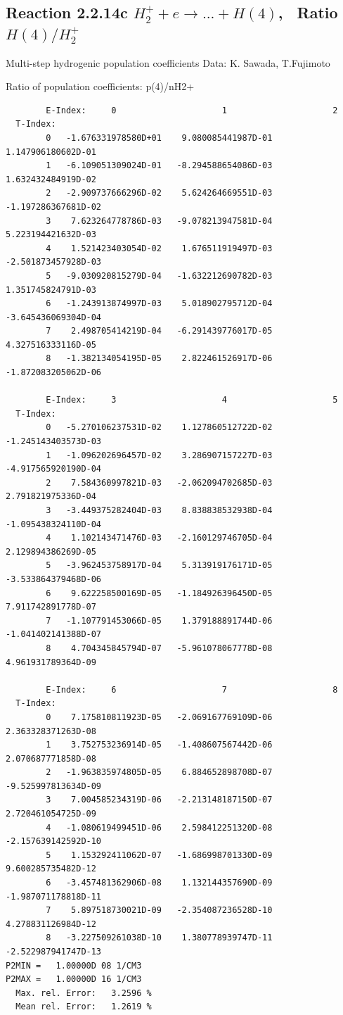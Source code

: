 \documentclass[12pt,dvipdfmx]{article}
\begin{document}
\subsection{
Reaction 2.2.14c $ H_2^+ + e \rightarrow ...+ H(4) $, \   Ratio $H(4)/H_2^+  $
}

 Multi-step hydrogenic population coefficients
 Data: K. Sawada, T.Fujimoto \cite{kn:Sawada}

 Ratio of population coefficients: p(4)/nH2+


\begin{small}\begin{verbatim}
        E-Index:     0                     1                     2
  T-Index:
        0   -1.676331978580D+01    9.080085441987D-01    1.147906180602D-01
        1   -6.109051309024D-01   -8.294588654086D-03    1.632432484919D-02
        2   -2.909737666296D-02    5.624264669551D-03   -1.197286367681D-02
        3    7.623264778786D-03   -9.078213947581D-04    5.223194421632D-03
        4    1.521423403054D-02    1.676511919497D-03   -2.501873457928D-03
        5   -9.030920815279D-04   -1.632212690782D-03    1.351745824791D-03
        6   -1.243913874997D-03    5.018902795712D-04   -3.645436069304D-04
        7    2.498705414219D-04   -6.291439776017D-05    4.327516333116D-05
        8   -1.382134054195D-05    2.822461526917D-06   -1.872083205062D-06

        E-Index:     3                     4                     5
  T-Index:
        0   -5.270106237531D-02    1.127860512722D-02   -1.245143403573D-03
        1   -1.096202696457D-02    3.286907157227D-03   -4.917565920190D-04
        2    7.584360997821D-03   -2.062094702685D-03    2.791821975336D-04
        3   -3.449375282404D-03    8.838838532938D-04   -1.095438324110D-04
        4    1.102143471476D-03   -2.160129746705D-04    2.129894386269D-05
        5   -3.962453758917D-04    5.313919176171D-05   -3.533864379468D-06
        6    9.622258500169D-05   -1.184926396450D-05    7.911742891778D-07
        7   -1.107791453066D-05    1.379188891744D-06   -1.041402141388D-07
        8    4.704345845794D-07   -5.961078067778D-08    4.961931789364D-09

        E-Index:     6                     7                     8
  T-Index:
        0    7.175810811923D-05   -2.069167769109D-06    2.363328371263D-08
        1    3.752753236914D-05   -1.408607567442D-06    2.070687771858D-08
        2   -1.963835974805D-05    6.884652898708D-07   -9.525997813634D-09
        3    7.004585234319D-06   -2.213148187150D-07    2.720461054725D-09
        4   -1.080619499451D-06    2.598412251320D-08   -2.157639142592D-10
        5    1.153292411062D-07   -1.686998701330D-09    9.600285735482D-12
        6   -3.457481362906D-08    1.132144357690D-09   -1.987071178818D-11
        7    5.897518730021D-09   -2.354087236528D-10    4.278831126984D-12
        8   -3.227509261038D-10    1.380778939747D-11   -2.522987941747D-13
P2MIN =   1.00000D 08 1/CM3
P2MAX =   1.00000D 16 1/CM3
  Max. rel. Error:   3.2596 %
  Mean rel. Error:   1.2619 %

\end{verbatim}\end{small}
\end{document}
